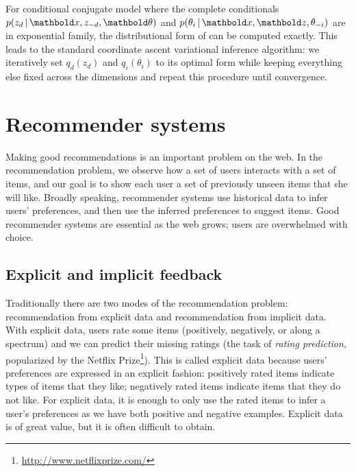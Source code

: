 For conditional conjugate model where the complete conditionals $p(z_d \g \mbx, z_{-d}, \mb\theta)$ and $p(\theta_i \g \mbx, \mbz, \theta_{-i})$ are in exponential family, the distributional form of  can be computed exactly. This leads to the standard coordinate ascent variational inference algorithm: we iteratively set $q_d(z_d)$ and $q_i(\theta_i)$ to its optimal form while keeping everything else fixed across the dimensions and repeat this procedure until convergence. 

\section{Recommender systems}\label{chpt:background:sec:recsys}

Making good recommendations is an important problem on the web. In the
recommendation problem, we observe how a set of users interacts with a
set of items, and our goal is to show each user a set of previously
unseen items that she will like.  Broadly speaking, recommender
systems use historical data to infer users' preferences, and then use
the inferred preferences to suggest items.  Good recommender
systems are essential as the web grows; users are overwhelmed with
choice.

\subsection{Explicit and implicit feedback} \label{chpt:background:sec:data}

Traditionally there are two modes of the recommendation problem: recommendation from explicit data and recommendation from implicit data.  With explicit
data, users rate some items (positively, negatively, or along a
spectrum) and we can predict their missing ratings (the task of \textit{rating prediction}, popularized by the Netflix Prize\footnote{\url{http://www.netflixprize.com/}}). This is called explicit data because users' preferences are expressed in an explicit fashion: positively rated items indicate types of items that they
like; negatively rated items indicate items that they do not like. For explicit data, it is enough to only use the rated items to infer a user's
preferences as we have both positive and negative examples. Explicit data is of great value, but it is often difficult to obtain. 

